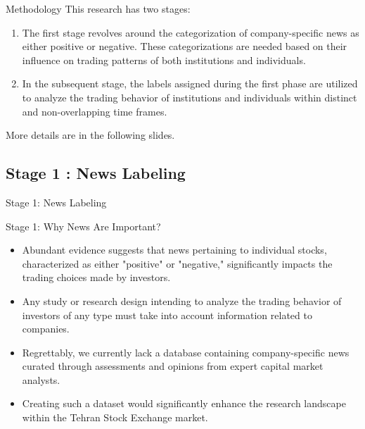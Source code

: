 \documentclass{beamer}
\begin{document}
\begin{frame}{Methodology}
    This research has two stages:

    \begin{enumerate}
        \item The first stage revolves around the categorization of company-specific news as either positive or negative. These categorizations are needed based on their influence on trading patterns of both institutions and individuals.
        \item In the subsequent stage, the labels assigned during the first phase are utilized to analyze the trading behavior of institutions and individuals within distinct and non-overlapping time frames.
    \end{enumerate}

    \par
    More details are in the following slides.

\end{frame}


\subsection{Stage 1 : News Labeling}

\begin{frame}
    \Huge
    \center
    Stage 1: News Labeling
\end{frame}


\begin{frame}{Stage 1: Why News Are Important?}

    \begin{itemize}
        \item Abundant evidence suggests that news pertaining to individual stocks, characterized as either "positive" or "negative," significantly impacts the trading choices made by investors.
        \item Any study or research design intending to analyze the trading behavior of investors of any type must take into account information related to companies.
        \item Regrettably, we currently lack a database containing company-specific news curated through assessments and opinions from expert capital market analysts.
        \item Creating such a dataset would significantly enhance the research landscape within the Tehran Stock Exchange market.
    \end{itemize}

\end{frame}
\end{document}
